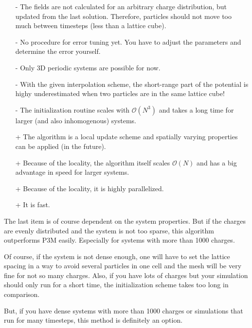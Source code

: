 \begin{itemize}
\item[-] The fields are not calculated for an arbitrary charge
  distribution, but updated from the last solution. Therefore,
  particles should not move too much between timesteps (less than a
  lattice cube).
\item[-] No procedure for error tuning yet. You have to adjust the
  parameters and determine the error yourself.
\item[-] Only 3D periodic systems are possible for now.
\item[-] With the given interpolation scheme, the short-range part of
  the potential is highy underestimated when two particles are in the
  same lattice cube!
\item[-] The initialization routine scales with $\mathcal{O}(N^3)$ and
  takes a long time for larger (and also inhomogenous) systems.
\item[+] The algorithm is a local update scheme and spatially varying
  properties can be applied (in the future).
\item[+] Because of the locality, the algorithm itself scales
  $\mathcal{O}(N)$ and has a big advantage in speed for larger
  systems.
\item[+] Because of the locality, it is highly parallelized.
\item[+] It is fast.
\end{itemize}

The last item is of course dependent on the system properties. But if
the charges are evenly distributed and the system is not too sparse,
this algorithm outperforms P3M easily. Especially for systems with
more than 1000 charges.

Of course, if the system is not dense enough, one will have to set the
lattice spacing in a way to avoid several particles in one cell and
the mesh will be very fine for not so many charges. Also, if you have
lots of charges but your simulation should only run for a short time,
the initialization scheme takes too long in comparison.

But, if you have dense systems with more than 1000 charges or
simulations that run for many timesteps, this method is definitely an
option.
